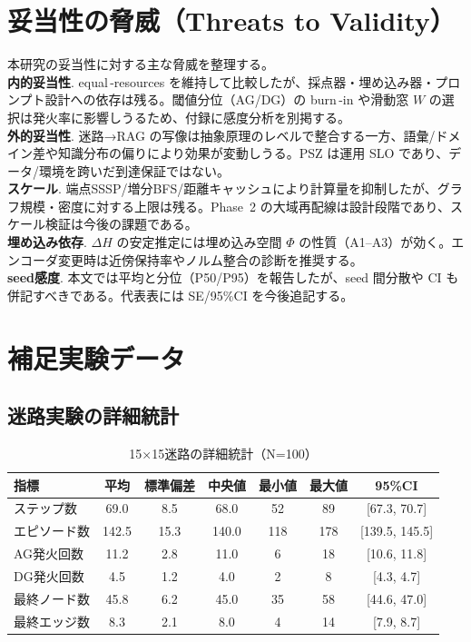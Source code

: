 \documentclass[ja=standard,xelatex]{bxjsarticle}
\begin{document}
\section{妥当性の脅威（Threats to Validity）}
\label{sec:threats}
\noindent 本研究の妥当性に対する主な脅威を整理する。\\
\textbf{内的妥当性}. equal\,\mbox{-}resources を維持して比較したが、採点器・埋め込み器・プロンプト設計への依存は残る。閾値分位（AG/DG）の burn\,\mbox{-}in や滑動窓 $W$ の選択は発火率に影響しうるため、付録に感度分析を別掲する。\\
\textbf{外的妥当性}. 迷路→RAG の写像は抽象原理のレベルで整合する一方、語彙/ドメイン差や知識分布の偏りにより効果が変動しうる。PSZ は運用 SLO であり、データ/環境を跨いだ到達保証ではない。\\
\textbf{スケール}. 端点SSSP/増分BFS/距離キャッシュにより計算量を抑制したが、グラフ規模・密度に対する上限は残る。Phase~2 の大域再配線は設計段階であり、スケール検証は今後の課題である。\\
\textbf{埋め込み依存}. $\Delta H$ の安定推定には埋め込み空間 $\Phi$ の性質（A1--A3）が効く。エンコーダ変更時は近傍保持率やノルム整合の診断を推奨する。\\
\textbf{seed感度}. 本文では平均と分位（P50/P95）を報告したが、seed 間分散や CI も併記すべきである。代表表には SE/95\%CI を今後追記する。




\appendix

\section{補足実験データ}

\subsection{迷路実験の詳細統計}

\begin{table}[H]
\centering
\caption{15×15迷路の詳細統計（N=100）}
\label{tab:maze_detail_15}
\small
\begin{tabular}{lcccccc}
\toprule
指標 & 平均 & 標準偏差 & 中央値 & 最小値 & 最大値 & 95\%CI \\
\midrule
ステップ数 & 69.0 & 8.5 & 68.0 & 52 & 89 & [67.3, 70.7] \\
エピソード数 & 142.5 & 15.3 & 140.0 & 118 & 178 & [139.5, 145.5] \\
AG発火回数 & 11.2 & 2.8 & 11.0 & 6 & 18 & [10.6, 11.8] \\
DG発火回数 & 4.5 & 1.2 & 4.0 & 2 & 8 & [4.3, 4.7] \\
最終ノード数 & 45.8 & 6.2 & 45.0 & 35 & 58 & [44.6, 47.0] \\
最終エッジ数 & 8.3 & 2.1 & 8.0 & 4 & 14 & [7.9, 8.7] \\
\bottomrule
\end{tabular}
\end{table}
\end{document}
